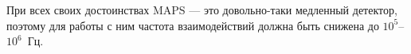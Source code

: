 При всех своих достоинствах MAPS --- это довольно-таки медленный детектор, поэтому для работы с ним частота взаимодействий должна быть снижена до $10^5$--$10^6$~Гц.




